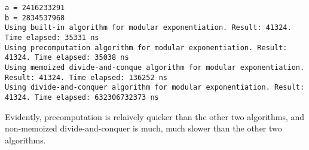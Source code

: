\documentclass[a4paper,10pt]{article}
\begin{document}
\begin{lstlisting}
a = 2416233291
b = 2834537968
Using built-in algorithm for modular exponentiation. Result: 41324. Time elapsed: 35331 ns
Using precomputation algorithm for modular exponentiation. Result: 41324. Time elapsed: 35038 ns
Using memoized divide-and-conque algorithm for modular exponentiation. Result: 41324. Time elapsed: 136252 ns
Using divide-and-conquer algorithm for modular exponentiation. Result: 41324. Time elapsed: 632306732373 ns
\end{lstlisting}
Evidently, precomputation is relaively quicker than the other two algorithms, and non-memoized divide-and-conquer is much, much slower than the other two algorithms.
\end{document}
